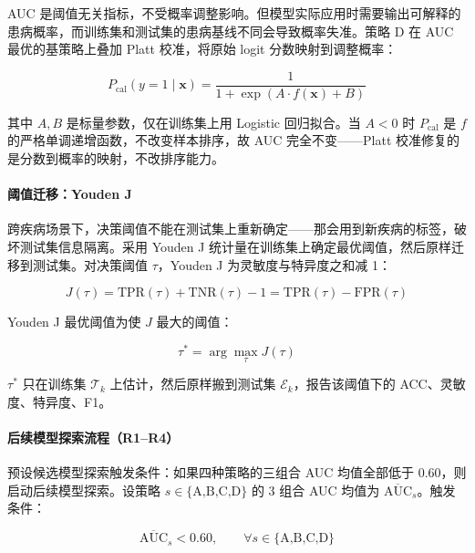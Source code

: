 \documentclass{../../latex/templates/mcm-paper}
\begin{document}
AUC 是阈值无关指标，不受概率调整影响。但模型实际应用时需要输出可解释的患病概率，而训练集和测试集的患病基线不同会导致概率失准。策略 D 在 AUC 最优的基策略上叠加 Platt 校准，将原始 logit 分数映射到调整概率：

\begin{equation}
P_{\mathrm{cal}}(y=1 \mid \mathbf{x}) = \frac{1}{1+\exp\!\left(A\cdot f(\mathbf{x}) + B\right)}
\label{eq:s3-platt}
\end{equation}

其中 $A,B$ 是标量参数，仅在训练集上用 Logistic 回归拟合。当 $A<0$ 时 $P_{\mathrm{cal}}$ 是 $f$ 的严格单调递增函数，不改变样本排序，故 AUC 完全不变——Platt 校准修复的是分数到概率的映射，不改排序能力。

\paragraph{阈值迁移：Youden J}

跨疾病场景下，决策阈值不能在测试集上重新确定——那会用到新疾病的标签，破坏测试集信息隔离。采用 Youden J 统计量在训练集上确定最优阈值，然后原样迁移到测试集。对决策阈值 $\tau$，Youden J 为灵敏度与特异度之和减 1：

\begin{equation}
J(\tau) = \mathrm{TPR}(\tau) + \mathrm{TNR}(\tau) - 1 = \mathrm{TPR}(\tau) - \mathrm{FPR}(\tau)
\label{eq:s3-youden}
\end{equation}

Youden J 最优阈值为使 $J$ 最大的阈值：

\begin{equation}
\tau^{*} = \arg\max_{\tau} J(\tau)
\label{eq:s3-youden-threshold}
\end{equation}

$\tau^{*}$ 只在训练集 $\mathcal{T}_k$ 上估计，然后原样搬到测试集 $\mathcal{E}_k$，报告该阈值下的 ACC、灵敏度、特异度、F1。

\paragraph{后续模型探索流程（R1–R4）}

预设候选模型探索触发条件：如果四种策略的三组合 AUC 均值全部低于 0.60，则启动后续模型探索。设策略 $s\in\{\text{A,B,C,D}\}$ 的 3 组合 AUC 均值为 $\overline{\mathrm{AUC}}_s$。触发条件：

\begin{equation}
\overline{\mathrm{AUC}}_s < 0.60, \qquad \forall s\in\{\text{A,B,C,D}\}
\label{eq:s3-fallback-trigger}
\end{equation}
\end{document}
